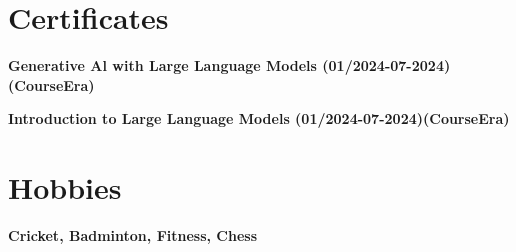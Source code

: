 \documentclass[letterpaper,11pt]{article}
\newcommand{\resumeSubHeadingListStart}{\begin{itemize}[leftmargin=0.15in, label={}]}
\newcommand{\resumeSubHeadingListEnd}{\end{itemize}}
\begin{document}
        
        
        
 

\section{Certificates}
  \vspace{2pt}
  \resumeSubHeadingListStart
    \small{\item{
        \textbf{Generative Al with Large Language Models (01/2024-07-2024)           (CourseEra)} \\ \vspace{3pt} 
        
        \textbf{Introduction to Large Language Models (01/2024-07-2024)(CourseEra)} 
    }}
  \resumeSubHeadingListEnd


 
 

\section{Hobbies}
  \resumeSubHeadingListStart
    \small{\item\textbf{Cricket, Badminton, Fitness, Chess}}
  \resumeSubHeadingListEnd


 


\end{document}
